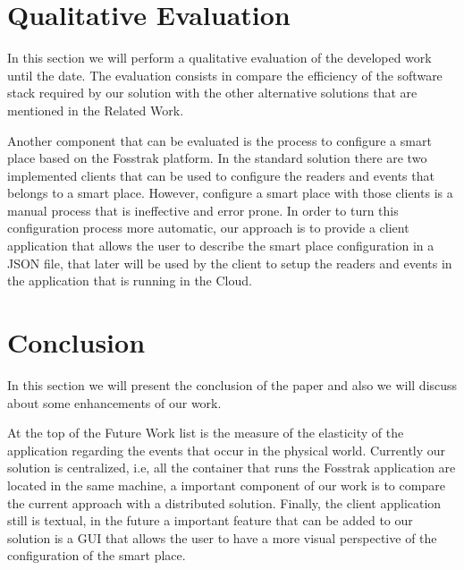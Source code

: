 \documentclass{../llncs2e/llncs}
\begin{document}
\section{Qualitative Evaluation}
\label{sec:qualitative_evaluation}
In this section we will perform a qualitative evaluation of the developed work until the date. The
evaluation consists in compare the efficiency of the software stack required by our solution with
the other alternative solutions that are mentioned in the Related Work.

Another component that can be evaluated is the process to configure a smart place based on the
Fosstrak platform. In the standard solution there are two implemented clients that can be used to
configure the readers and events that belongs to a smart place. However, configure a smart place
with those clients is a manual process that is ineffective and error prone. In order to turn this
configuration process more automatic, our approach is to provide a client application that allows
the user to describe the smart place configuration in a JSON file, that later will be used by the
client to setup the readers and events in the application that is running in the Cloud.
\section{Conclusion}
\label{sec:conclusion}
In this section we will present the conclusion of the paper and also we will discuss about some
enhancements of our work.

At the top of the Future Work list is the measure of the elasticity of the application regarding
the events that occur in the physical world. Currently our solution is centralized, i.e, all the
container that runs the Fosstrak application are located in the same machine, a important component
of our work is to compare the current approach with a distributed solution. Finally, the client
application still is textual, in the future a important feature that can be added to our solution
is a GUI that allows the user to have a more visual perspective of the configuration of the smart
place. 
%
%
\end{document}
